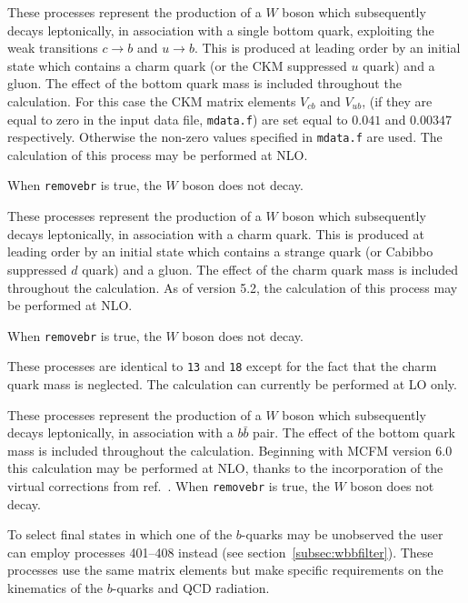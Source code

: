 These processes represent the production of a $W$ boson which
subsequently decays leptonically, in association with a single bottom
quark, exploiting the weak transitions $c \to b$ and $u \to b$.
This is produced at leading order by an initial state which
contains a charm quark (or the CKM  suppressed $u$ quark) and a
gluon.  The effect of the bottom quark mass is included throughout the
calculation.  
For this case the CKM matrix elements $V_{cb}$ and $V_{ub}$,
(if they are equal to zero in the input data file, {\tt mdata.f})
are set equal to $0.041$ and $0.00347$ respectively. 
Otherwise the non-zero values specified in {\tt mdata.f} are used. 
The calculation of this process may
be performed at NLO.

When {\tt removebr} is true, the $W$ boson does not decay.

\label{subsec:wc}

These processes represent the production of a $W$ boson which
subsequently decays leptonically, in association with a charm
quark. This is produced at leading order by an initial state which
contains a strange quark (or Cabibbo suppressed $d$ quark) and a
gluon.  The effect of the charm quark mass is included throughout the
calculation.  As of version 5.2, the calculation of this process may
be performed at NLO.

When {\tt removebr} is true, the $W$ boson does not decay.

\label{subsec:wcmassless}

These processes are identical to {\tt 13} and {\tt 18} except for the fact
that the charm quark mass is neglected. The calculation can currently be
performed at LO only.

\label{subsec:wbb}

These processes represent the production of a $W$ boson which subsequently
decays leptonically, in association with a $b{\bar b}$ pair. The effect of
the bottom quark mass is included throughout the calculation.  
Beginning with MCFM version 6.0 this calculation may be performed at NLO, thanks to
the incorporation of the virtual corrections from ref.~\cite{Badger:2010mg}.
When {\tt removebr} is true, the $W$ boson does not decay.

To select final states in which one of the $b$-quarks may be unobserved the
user can employ processes 401--408 instead (see section~\ref{subsec:wbbfilter}).
These processes use the same matrix
elements but make specific requirements on the kinematics of the $b$-quarks
and QCD radiation. 

